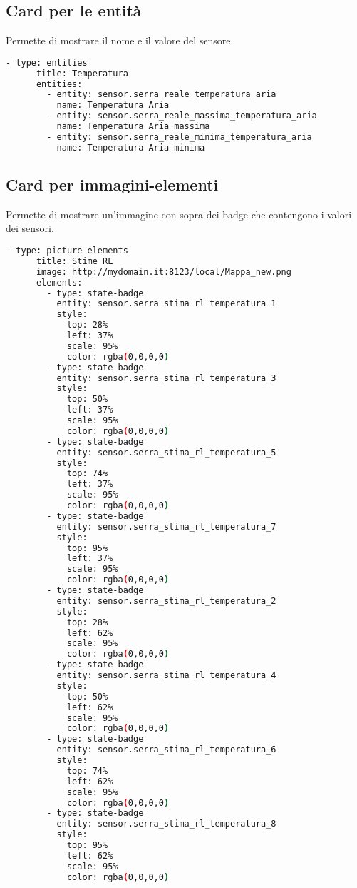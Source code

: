 \subsection*{Card per le entità}
\label{sec:hass-appendix-plancia-entità}
Permette di mostrare il nome e il valore del sensore.
\begin{lstlisting}[language=bash]
    - type: entities
      title: Temperatura
      entities:
        - entity: sensor.serra_reale_temperatura_aria
          name: Temperatura Aria
        - entity: sensor.serra_reale_massima_temperatura_aria
          name: Temperatura Aria massima
        - entity: sensor.serra_reale_minima_temperatura_aria
          name: Temperatura Aria minima    
\end{lstlisting}

\subsection*{Card per immagini-elementi}
\label{sec:hass-appendix-plancia-pic-ele}
Permette di mostrare un'immagine con sopra dei badge 
che contengono i valori dei sensori.
\begin{lstlisting}[language=bash]
    - type: picture-elements
      title: Stime RL
      image: http://mydomain.it:8123/local/Mappa_new.png
      elements:
        - type: state-badge
          entity: sensor.serra_stima_rl_temperatura_1
          style:
            top: 28%
            left: 37%
            scale: 95%
            color: rgba(0,0,0,0)
        - type: state-badge
          entity: sensor.serra_stima_rl_temperatura_3
          style:
            top: 50%
            left: 37%
            scale: 95%
            color: rgba(0,0,0,0)
        - type: state-badge
          entity: sensor.serra_stima_rl_temperatura_5
          style:
            top: 74%
            left: 37%
            scale: 95%
            color: rgba(0,0,0,0)
        - type: state-badge
          entity: sensor.serra_stima_rl_temperatura_7
          style:
            top: 95%
            left: 37%
            scale: 95%
            color: rgba(0,0,0,0)
        - type: state-badge
          entity: sensor.serra_stima_rl_temperatura_2
          style:
            top: 28%
            left: 62%
            scale: 95%
            color: rgba(0,0,0,0)
        - type: state-badge
          entity: sensor.serra_stima_rl_temperatura_4
          style:
            top: 50%
            left: 62%
            scale: 95%
            color: rgba(0,0,0,0)
        - type: state-badge
          entity: sensor.serra_stima_rl_temperatura_6
          style:
            top: 74%
            left: 62%
            scale: 95%
            color: rgba(0,0,0,0)
        - type: state-badge
          entity: sensor.serra_stima_rl_temperatura_8
          style:
            top: 95%
            left: 62%
            scale: 95%
            color: rgba(0,0,0,0)
\end{lstlisting}

